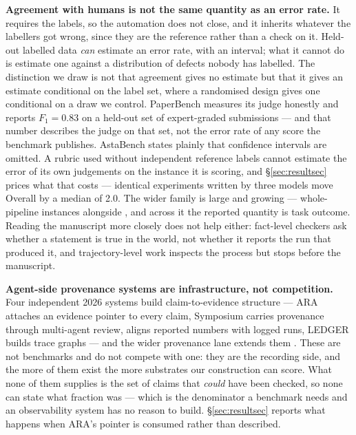 \documentclass[10pt]{article}
\newcommand{\RM}[1]{{#1}}
\begin{document}
\textbf{Agreement with humans is not the same quantity as an error rate.} It
requires the labels, so the automation does not close, and it inherits whatever
the labellers got wrong, since they are the reference rather than a check on it.
Held-out labelled data \emph{can} estimate an error rate, with an interval; what
it cannot do is estimate one against a distribution of defects nobody has
labelled. The distinction we draw is not that agreement gives no estimate but
that it gives an estimate conditional on the label set, where a randomised
design gives one conditional on a draw we control. PaperBench measures its judge honestly and
reports $F_1=0.83$ on a held-out set of expert-graded submissions --- and
that number describes the judge on that set, not the error rate of any score
the benchmark publishes. AstaBench states plainly that confidence intervals are
omitted. A rubric used without independent reference labels cannot estimate the
error of its own judgements on the instance it is scoring, and
\S\ref{sec:resultsec} prices what that costs --- identical experiments written by
three models move Overall by a median of \RM{2.0}. The wider family is large and growing --- whole-pipeline
instances \cite{rcb,researchgym2026} alongside
\cite{huang2024mlagentbench,chen2025scienceagentbench,fire2026}, and across it the reported quantity is task outcome. Reading the
manuscript more closely does not help either: fact-level checkers
\cite{min2023factscore,wei2024longform} ask whether a statement is true in the
world, not whether it reports the run that produced it, and trajectory-level
work \cite{from2026c,zhuge2024agentasajudge} inspects the process but stops
before the manuscript.

\textbf{Agent-side provenance systems are infrastructure, not competition.}
Four independent 2026 systems build claim-to-evidence structure --- ARA
\cite{ara} attaches an evidence pointer to every claim, Symposium
\cite{symposium} carries provenance through multi-agent review,
\cite{fluent} aligns reported numbers with logged runs, LEDGER
\cite{ledger2026} builds trace graphs --- and the wider provenance lane extends
them \cite{papertrail2026,skilltrace2026,trace}. These
are not benchmarks and do not compete with one: they are the recording side,
and the more of them exist the more substrates our construction can score. What
none of them supplies is the set of claims that \emph{could} have been checked,
so none can state what fraction was --- which is the denominator a benchmark
needs and an observability system has no reason to build.
\S\ref{sec:resultsec} reports what happens when ARA's pointer is consumed
rather than described.
\end{document}
